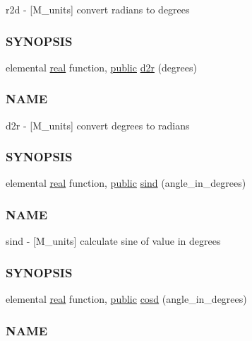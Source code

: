 \begin{DoxyCompactItemize}
\begin{DoxyCompactList}
r2d -\/ \mbox{[}M\+\_\+units\mbox{]} convert radians to degrees \subsubsection*{S\+Y\+N\+O\+P\+S\+IS}\end{DoxyCompactList}\item 
elemental \hyperlink{read__watch_83_8txt_abdb62bde002f38ef75f810d3a905a823}{real} function, \hyperlink{M__stopwatch_83_8txt_a2f74811300c361e53b430611a7d1769f}{public} \hyperlink{namespacem__units_a51fd676dee35aafbbd777cb88c347e23}{d2r} (degrees)
\begin{DoxyCompactList}\small\item\em \subsubsection*{N\+A\+ME}

d2r -\/ \mbox{[}M\+\_\+units\mbox{]} convert degrees to radians \subsubsection*{S\+Y\+N\+O\+P\+S\+IS}\end{DoxyCompactList}\item 
elemental \hyperlink{read__watch_83_8txt_abdb62bde002f38ef75f810d3a905a823}{real} function, \hyperlink{M__stopwatch_83_8txt_a2f74811300c361e53b430611a7d1769f}{public} \hyperlink{namespacem__units_afe7f79e1832a71630c0f83602a309aef}{sind} (angle\+\_\+in\+\_\+degrees)
\begin{DoxyCompactList}\small\item\em \subsubsection*{N\+A\+ME}

sind -\/ \mbox{[}M\+\_\+units\mbox{]} calculate sine of value in degrees \subsubsection*{S\+Y\+N\+O\+P\+S\+IS}\end{DoxyCompactList}\item 
elemental \hyperlink{read__watch_83_8txt_abdb62bde002f38ef75f810d3a905a823}{real} function, \hyperlink{M__stopwatch_83_8txt_a2f74811300c361e53b430611a7d1769f}{public} \hyperlink{namespacem__units_ac02800d0ec7fcffc2fdb2a2216770678}{cosd} (angle\+\_\+in\+\_\+degrees)
\begin{DoxyCompactList}\small\item\em \subsubsection*{N\+A\+ME}


\end{DoxyCompactList}
\end{DoxyCompactItemize}
